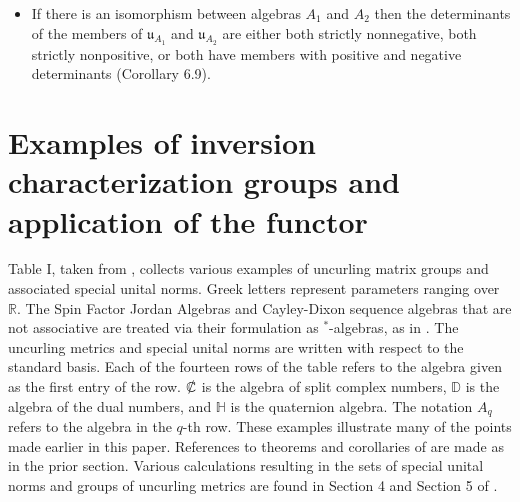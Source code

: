\documentclass{amsart}
\numberwithin{equation}{section}
\theoremstyle{definition}
\numberwithin{theorem}{section}
\begin{document}
\begin{itemize}
\item If there is an isomorphism between algebras $A_1$ and $A_2$ then the determinants of the members of $\mathfrak{u}_{A_1}$ and $\mathfrak{u}_{A_2}$ are either  both strictly nonnegative, both strictly nonpositive, or both have members with positive and negative determinants (Corollary 6.9).
\end{itemize}
  

\section{Examples of inversion characterization groups and application of the functor}

Table I, taken from \cite{fgreensite:2023}, collects various examples of uncurling matrix groups and associated special unital norms.  Greek letters represent parameters ranging over $\mathbb{R}$.  The Spin Factor Jordan Algebras and Cayley-Dixon sequence algebras that are not associative are treated via their formulation as $^*$-algebras, as in \cite{fgreensite:2023}. The uncurling metrics and special unital norms are written with respect to the standard basis.  Each of the fourteen rows of the table refers to the algebra given as the first entry of the row.  $\slashed{\mathbb{C}}$ is the algebra of split complex numbers, $\mathbb{D}$ is the algebra of the dual numbers, and $\mathbb{H}$ is the quaternion algebra.  The notation $A_q$ refers to the algebra in the $q$-th row.  These examples illustrate many of the points made earlier in this paper.  References to theorems and corollaries of \cite{fgreensite:2023} are made as in the prior section.  Various calculations resulting in the sets of special unital norms and groups of uncurling metrics are found in Section 4 and Section 5 of \cite{fgreensite:2023}.
\end{document}
